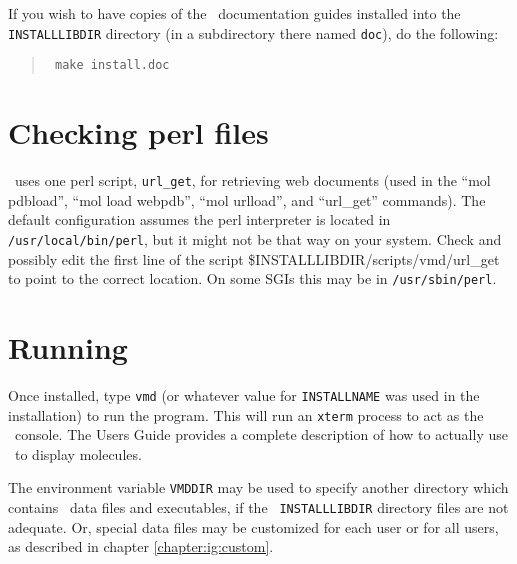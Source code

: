 If you wish to have copies of the \VMD\ documentation guides installed
into the {\tt INSTALLLIBDIR} directory (in a subdirectory there named
{\tt doc}), do the following:
\begin{quote} {\tt
  make install.doc
} \end{quote}


\section{Checking perl files}
\label{section:ig:perl}

\VMD\ uses one perl script, {\tt url\_get}, for retrieving web documents
(used in the ``mol pdbload'', ``mol load webpdb'', ``mol urlload'', and ``url\_get''
commands).  The default configuration assumes the perl interpreter is
located in {\tt /usr/local/bin/perl}, but it might not be that way on
your system.  Check and possibly edit the first line of the script
\$INSTALLLIBDIR/scripts/vmd/url\_get to point to the correct location.
On some SGIs this may be in {\tt /usr/sbin/perl}.

\section{Running \VMD}
\label{section:ig:running}

Once installed, type {\tt vmd} (or whatever value for {\tt INSTALLNAME} was
used in the installation) to run the program.  This will run an {\tt xterm}
process to act as the \VMD\ console.  The Users Guide provides a complete
description of how to actually use \VMD\ to display molecules.

The environment variable {\tt VMDDIR} may be used to specify another
directory which contains \VMD\ data files and executables, if the {\tt
INSTALLLIBDIR} directory files are not adequate.  Or, special data
files may be customized for each user or for all users, as described
in chapter \ref{chapter:ig:custom}.

